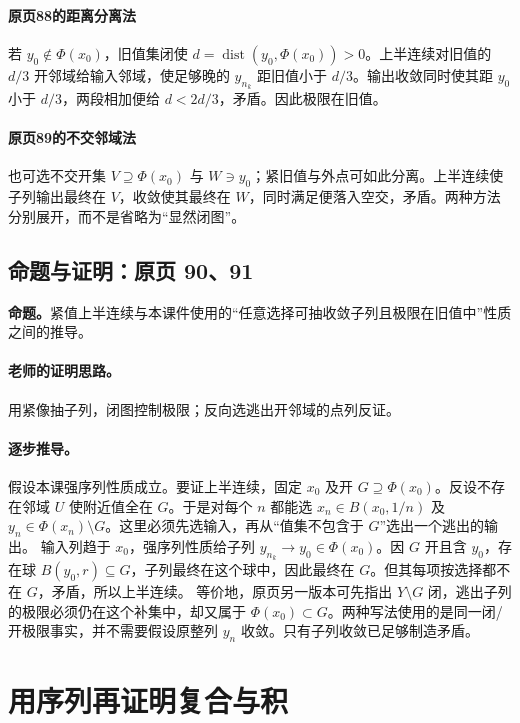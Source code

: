 \documentclass[11pt,a4paper]{article}
\theoremstyle{definition}\newtheorem{definition}{定义}\newtheorem{example}{例}
\begin{document}
\paragraph{原页88的距离分离法}
若 $y_0\notin\Phi(x_0)$，旧值集闭使 $d=\operatorname{dist}(y_0,\Phi(x_0))>0$。上半连续对旧值的 $d/3$ 开邻域给输入邻域，使足够晚的 $y_{n_k}$ 距旧值小于 $d/3$。输出收敛同时使其距 $y_0$ 小于 $d/3$，两段相加便给 $d<2d/3$，矛盾。因此极限在旧值。
\paragraph{原页89的不交邻域法}
也可选不交开集 $V\supseteq\Phi(x_0)$ 与 $W\ni y_0$；紧旧值与外点可如此分离。上半连续使子列输出最终在 $V$，收敛使其最终在 $W$，同时满足便落入空交，矛盾。两种方法分别展开，而不是省略为“显然闭图”。


\subsection{命题与证明：原页 90、91}

\textbf{命题。}紧值上半连续与本课件使用的“任意选择可抽收敛子列且极限在旧值中”性质之间的推导。

\paragraph{老师的证明思路。}用紧像抽子列，闭图控制极限；反向选逃出开邻域的点列反证。

\paragraph{逐步推导。}
假设本课强序列性质成立。要证上半连续，固定 $x_0$ 及开 $G\supseteq\Phi(x_0)$。反设不存在邻域 $U$ 使附近值全在 $G$。于是对每个 $n$ 都能选 $x_n\in B(x_0,1/n)$ 及 $y_n\in\Phi(x_n)\setminus G$。这里必须先选输入，再从“值集不包含于 $G$”选出一个逃出的输出。
输入列趋于 $x_0$，强序列性质给子列 $y_{n_k}\to y_0\in\Phi(x_0)$。因 $G$ 开且含 $y_0$，存在球 $B(y_0,r)\subseteq G$，子列最终在这个球中，因此最终在 $G$。但其每项按选择都不在 $G$，矛盾，所以上半连续。
等价地，原页另一版本可先指出 $Y\setminus G$ 闭，逃出子列的极限必须仍在这个补集中，却又属于 $\Phi(x_0)\subset G$。两种写法使用的是同一闭/开极限事实，并不需要假设原整列 $y_n$ 收敛。只有子列收敛已足够制造矛盾。


\clearpage\section{用序列再证明复合与积}\label{g:108:92}
\end{document}
